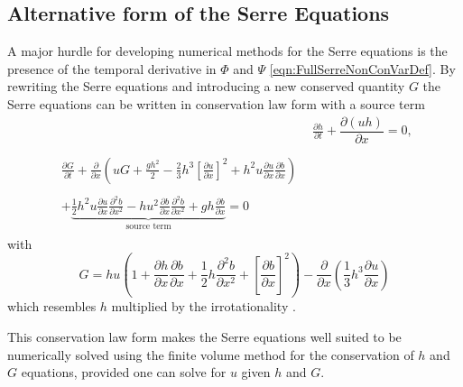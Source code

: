 \subsection{Alternative form of the Serre Equations}
A major hurdle for developing numerical methods for the Serre equations is the presence of the temporal derivative in $\Phi$ and $\Psi$ \eqref{eqn:FullSerreNonConVarDef}. By rewriting the Serre equations and introducing a new conserved quantity $G$ \cite{Hank-etal-2010-2034,Zoppou-2014,Li-2014-169} the Serre equations can be written in conservation law form with a source term
\begin{subequations}
	\label{eqn:FullSerreCon}
	\begin{align}
	& \frac{\partial h}{\partial t} + \dfrac{\partial (uh)}{\partial x} = 0 ,\label{eqn:FullSerreConMass}  \\ \nonumber \\
	\begin{split}
	\label{eqn:Serreconsconmom}
	\frac{\partial G}{\partial t}  + \frac{\partial}{\partial x} \left( {u} G + \frac{gh^2}{2} - \frac{2}{3}h^3 \left[\frac{\partial {u}}{\partial x}\right]^2 + h^2 {u}\frac{\partial {u}}{\partial x}\frac{\partial b}{\partial x} \right) \\ \\ +  \underbrace{\frac{1}{2}h^2 {u} \frac{\partial {u}}{\partial x} \frac{\partial^2 b}{\partial x^2}  - h {u}^2\frac{\partial b}{\partial x}\frac{\partial^2 b}{\partial x^2} + gh\frac{\partial b}{\partial x} } _{\text{source term}} = 0
	\end{split}
	\end{align}
\end{subequations}
with
\begin{equation}
\label{defn:SerreEqnConservedQuantity1}
G =  h {u} \left(1 + \frac{\partial h}{\partial x}\frac{\partial b}{\partial x} + \frac{1}{2}h\frac{\partial^2 b}{\partial x^2} + \left[\frac{\partial b}{\partial x}\right]^2 \right) - \frac{\partial}{\partial x}\left(\frac{1}{3}h^3  \frac{\partial {u}}{\partial x}\right)
\end{equation}
which resembles $h$ multiplied by the irrotationality \cite{Choi-Camassa-1999-1,Carter-Cienfuegos-2011-259}.

This conservation law form makes the Serre equations well suited to be numerically solved using the finite volume method for the conservation of $h$ and $G$ equations, provided one can solve for $u$ given $h$ and $G$.

